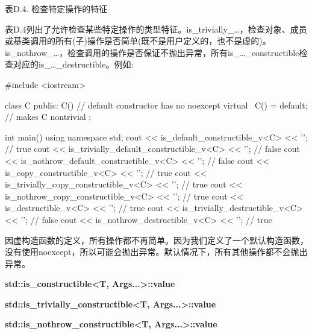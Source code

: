\begin{center}
表D.4. 检查特定操作的特征
\end{center}

表D.4列出了允许检查某些特定操作的类型特征。is\_trivially\_…，检查对象、成员或基类调用的所有(子)操作是否简单(既不是用户定义的，也不是虚的)。is\_nothrow\_…，检查调用的操作是否保证不抛出异常，所有is\_…\_constructible检查对应的is\_…\_destructible。例如:

\begin{cpp}
#include <iostream>

class C {
	public:
	C() { // default constructor has no noexcept
	}
	virtual ~C() = default; // makes C nontrivial
};

int main()
{
	using namespace std;
	cout << is_default_constructible_v<C> << ’\n’; // true
	cout << is_trivially_default_constructible_v<C> << ’\n’; // false
	cout << is_nothrow_default_constructible_v<C> << ’\n’; // false
	cout << is_copy_constructible_v<C> << ’\n’; // true
	cout << is_trivially_copy_constructible_v<C> << ’\n’; // true
	cout << is_nothrow_copy_constructible_v<C> << ’\n’; // true
	cout << is_destructible_v<C> << ’\n’; // true
	cout << is_trivially_destructible_v<C> << ’\n’; // false
	cout << is_nothrow_destructible_v<C> << ’\n’; // true
}
\end{cpp}

因虚构造函数的定义，所有操作都不再简单。因为我们定义了一个默认构造函数，没有使用noexcept，所以可能会抛出异常。默认情况下，所有其他操作都不会抛出异常。

\textbf{std::is\_constructible<T, Args...>::value}

\textbf{std::is\_trivially\_constructible<T, Args...>::value}

\textbf{std::is\_nothrow\_constructible<T, Args...>::value}

